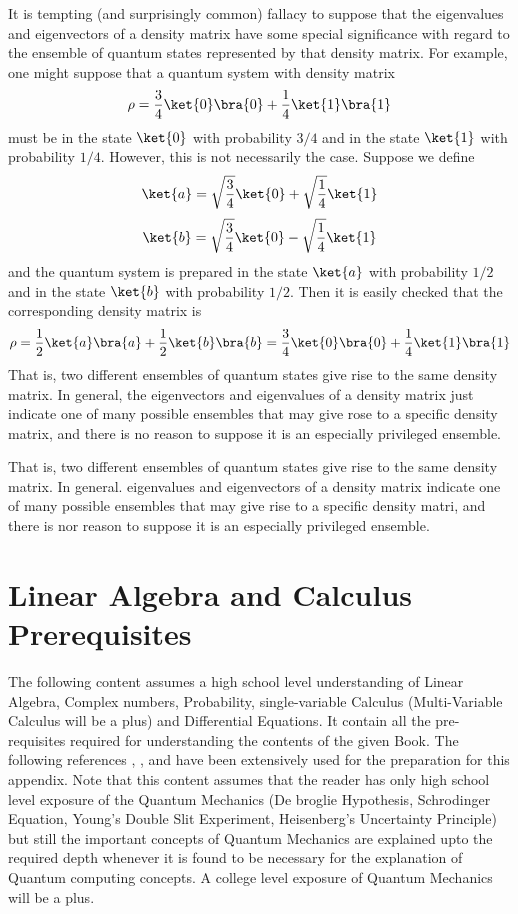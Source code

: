 \documentclass[12pt, oneside]{book}
\theoremstyle{definition}
\theoremstyle{definition}
\theoremstyle{remark}
\begin{document}
It is tempting (and surprisingly common) fallacy to suppose that the eigenvalues and eigenvectors of a density matrix have some special significance with regard to the ensemble of quantum states represented by that density matrix. For example, one might suppose that a quantum system with density matrix
\[
\rho=\frac{3}{4}\ket{0}\bra{0} +\frac{1}{4}\ket{1}\bra{1}
\]
must be in the state $\ket{0}$ with probability $3/4$ and in the state $\ket{1}$ with probability $1/4$. However, this is not necessarily the case. Suppose we define
\[
\ket{a}=\sqrt{\frac{3}{4}}\ket{0}+\sqrt{\frac{1}{4}}\ket{1}
\]
\[
\ket{b}=\sqrt{\frac{3}{4}}\ket{0}-\sqrt{\frac{1}{4}}\ket{1}
\]
and the quantum system is prepared in the state $\ket{a}$ with probability $1/2$ and in the state $\ket{b}$ with probability $1/2$. Then it is easily checked that the corresponding density matrix is 
\[
\rho=\frac{1}{2}\ket{a}\bra{a}+\frac{1}{2}\ket{b}\bra{b}=\frac{3}{4}\ket{0}\bra{0}+\frac{1}{4}\ket{1}\bra{1}
\]
That is, two different ensembles of quantum states give rise to the same density matrix. In general, the eigenvectors and eigenvalues of a density matrix just indicate one of many possible ensembles that may give rose to a specific density matrix, and there is no reason to suppose it is an especially privileged ensemble.

That is, two different ensembles of quantum states give rise to the same density matrix. In general. eigenvalues and eigenvectors of a density matrix indicate one of many possible ensembles that may give rise to a specific density matri, and there is nor reason to suppose it is an especially privileged ensemble.



\appendix  %

\chapter{Linear Algebra and Calculus Prerequisites}
The following content assumes a high school level understanding of Linear Algebra, Complex numbers, Probability, single-variable Calculus 
(Multi-Variable Calculus will be a plus) and
Differential Equations. 
It contain all the pre-requisites required for understanding the contents of the given 
Book. The following references \cite{nielsen2001quantum}, \cite{dewolf2023quantum}, \cite{shankar2012principles}
and \cite{lin2022lecture} have been extensively used for the preparation for this appendix. 
Note that this content assumes that the reader has only high school level 
exposure of the Quantum Mechanics (De broglie Hypothesis, Schrodinger Equation, Young's Double Slit Experiment, Heisenberg's Uncertainty Principle) but still the important concepts of Quantum Mechanics are explained 
upto the required depth whenever it
is found to be necessary for the explanation of Quantum computing concepts. A college level
exposure of Quantum Mechanics will be a plus.
\end{document}
